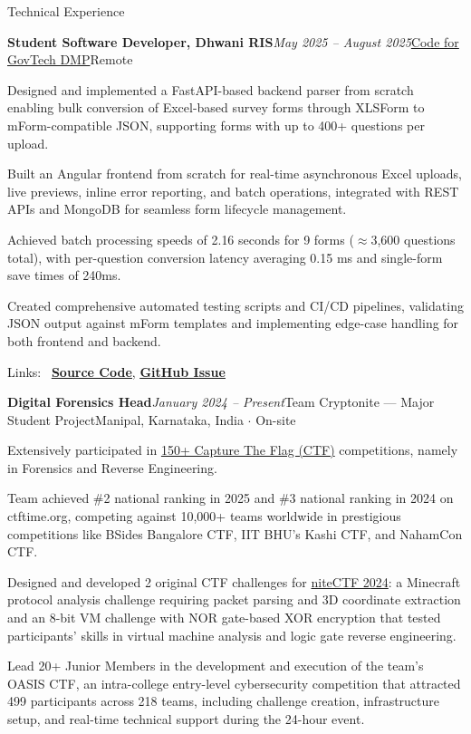 \documentclass{resume} %
\begin{document}
\begin{rSection}{Technical Experience}

\begin{rSubsection}{\bf Student Software Developer, Dhwani RIS}{\em May 2025 -- August 2025}{\href{https://codeforgovtech.in/dedicated_mentoring_program/}{Code for GovTech DMP}}{Remote}
\item Designed and implemented a FastAPI-based backend parser from scratch enabling bulk conversion of Excel-based survey forms through XLSForm to mForm-compatible JSON, supporting forms with up to 400+ questions per upload.
\item Built an Angular frontend from scratch for real-time asynchronous Excel uploads, live previews, inline error reporting, and batch operations, integrated with REST APIs and MongoDB for seamless form lifecycle management.
\item Achieved batch processing speeds of 2.16 seconds for 9 forms ($\approx$3,600 questions total), with per-question conversion latency averaging 0.15 ms and single-form save times of 240ms.
\item Created comprehensive automated testing scripts and CI/CD pipelines, validating JSON output against mForm templates and implementing edge-case handling for both frontend and backend.
\item Links: \faGithub~\href{https://github.com/vee1e/bulk-questionnaire-upload}{\textbf{\underline{Source Code}}}, \href{https://github.com/dhwani-ris/bulk-questionnaire-upload/issues/1}{\textbf{\underline{GitHub Issue}}}
\end{rSubsection}

\begin{rSubsection}{\bf Digital Forensics Head}{\em January 2024 -- Present}{Team Cryptonite --- Major Student Project}{Manipal, Karnataka, India $\cdot$ On-site}
\item Extensively participated in \href{https://ctftime.org/team/62713/}{150+ Capture The Flag (CTF)} competitions, namely in Forensics and Reverse Engineering.
\item Team achieved \#2 national ranking in 2025 and \#3 national ranking in 2024 on ctftime.org, competing against 10,000+ teams worldwide in prestigious competitions like BSides Bangalore CTF, IIT BHU's Kashi CTF, and NahamCon CTF.
\item Designed and developed 2 original CTF challenges for \href{https://github.com/Cryptonite-MIT/niteCTF-2024/}{niteCTF 2024}: a Minecraft protocol analysis challenge requiring packet parsing and 3D coordinate extraction and an 8-bit VM challenge with NOR gate-based XOR encryption that tested participants' skills in virtual machine analysis and logic gate reverse engineering.
\item Lead 20+ Junior Members in the development and execution of the team's OASIS CTF, an intra-college entry-level cybersecurity competition that attracted 499 participants across 218 teams, including challenge creation, infrastructure setup, and real-time technical support during the 24-hour event.
\end{rSubsection}


\end{rSection}
\end{document}
